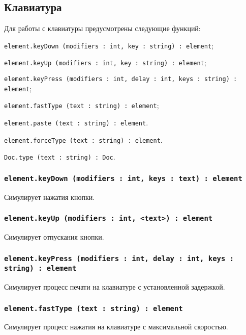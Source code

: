 \subsection{Клавиатура}

Для работы с клавиатуры предусмотрены следующие функций:
\begin{icItems}
	\item \lstinline|element.keyDown (modifiers : int, key : string) : element|;
	\item \lstinline|element.keyUp (modifiers : int, key : string) : element|;
	\item \lstinline|element.keyPress (modifiers : int, delay : int, keys : string) : element|;
	\item \lstinline|element.fastType (text : string) : element|;
	\item \lstinline|element.paste (text : string) : element|.
	\item \lstinline|element.forceType (text : string) : element|.
	\item \lstinline|Doc.type (text : string) : Doc|.
\end{icItems}

\subsubsection{\lstinline|element.keyDown (modifiers : int, keys : text) : element|}

Симулирует нажатия кнопки.

\subsubsection{\lstinline|element.keyUp (modifiers : int, <text>) : element|}

Симулирует отпускания кнопки.

\subsubsection{\lstinline|element.keyPress (modifiers : int, delay : int, keys : string) : element|}

Симулирует процесс печати на клавиатуре с установленной задержкой.

\subsubsection{\lstinline|element.fastType (text : string) : element|}

Симулирует процесс нажатия на клавиатуре с максимальной скоростью.

